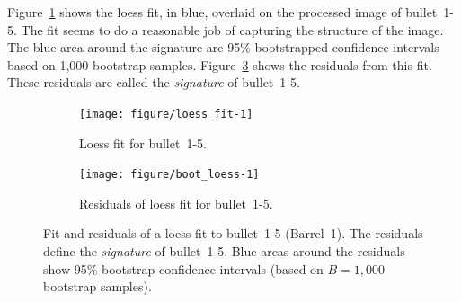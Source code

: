 \documentclass[aoas, preprint]{imsart}\usepackage[]{graphicx}\usepackage[]{color}
\newenvironment{knitrout}{}{} %
\newcommand{\hh}[1]{{\color{magenta} #1}}
\begin{document}

Figure~\ref{fig:loess_fit} shows the loess fit, in blue, overlaid on the processed image of bullet~1-5. The fit seems to do a reasonable job of capturing the structure of the image. The blue area around the signature are  95\% bootstrapped confidence intervals based on 1,000 bootstrap samples. 
Figure~\ref{fig:loess_resid} shows the residuals from this fit. These residuals are called the \emph{signature} of bullet~1-5.
%
\begin{figure}[hbtp]
  \centering
\begin{subfigure}[b]{.49\textwidth}\centering
\caption{\label{fig:loess_fit} Loess fit for bullet~1-5.}
\begin{knitrout}
\color{fgcolor}
\texttt{[image: figure/loess\_fit-1]} 

\end{knitrout}
\end{subfigure}
\begin{subfigure}[b]{.49\textwidth}\centering
\caption{\label{fig:loess_resid} Residuals of loess fit for bullet~1-5.
}
\begin{knitrout}
\color{fgcolor}
\texttt{[image: figure/boot\_loess-1]} 

\end{knitrout}
\end{subfigure}
\caption{Fit and residuals of a loess fit to bullet~1-5 (Barrel~1). The residuals define the {\it signature} of bullet~1-5. Blue areas around the residuals show  95\% bootstrap confidence intervals (based on $B=1,000$ bootstrap samples).
}
\end{figure}
%
\end{document}
